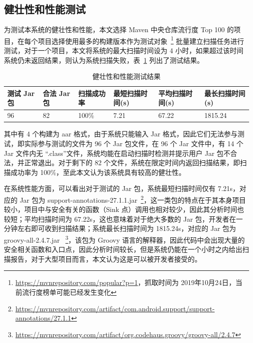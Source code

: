 \subsection{健壮性和性能测试}

为测试本系统的健壮性和性能，本文选择 Maven 中央仓库流行度 Top 100 的项目，在每个项目选择使用最多的构建版本作为测试对象~\footnote{\url{https://mvnrepository.com/popular?p=1}，抓取时间为 2019年10月24日，当前流行度榜单可能已经发生变化} 批量建立扫描任务进行测试，对于一个项目，本文将系统的最大扫描时间设为 4 小时，如果超过该时间系统仍未返回结果，则认为系统扫描失败，表~\ref{robustTest} 列出了测试结果。

\begin{table}[!htb]\footnotesize
    \centering
    \caption{健壮性和性能测试结果}
    \begin{tabular}{llllll}
        \toprule
        \textbf{测试 Jar 包}&\textbf{合法 Jar 包} & \textbf{扫描成功率} &\textbf{最短扫描时间(s)}&\textbf{平均扫描时间(s)} & \textbf{最长扫描时间(s)} \\
        \midrule
        96 & 82 & 100\%  & 7.21 & 67.22 &1815.24 \\
        \bottomrule
    \end{tabular}
    \label{robustTest}
\end{table}

其中有 4 个构建为 aar 格式，由于系统只能输入 Jar 格式，因此它们无法参与测试，即实际参与测试的文件为 96 个 Jar 包文件，在 96 个 Jar 文件中，有 14 个Jar 文件内无 “.class”文件，系统均能在启动扫描时检测并提示用户 Jar 包不合法，并正常退出。对于剩下的 82 个文件，系统在限定时间内返回扫描结果，即扫描成功率为 100\%，至此本文认为该系统具有较高的健壮性。

在系统性能方面，可以看出对于测试的 Jar 包，系统最短扫描时间仅有 7.21s，对应的 Jar 包为 support-annotations-27.1.1.jar~\footnote{\url{https://mvnrepository.com/artifact/com.android.support/support-annotations/27.1.1}}，这一类包的特点在于其本身项目较小，项目中与安全有关的函数（Sink 点）调用也相对较少，因此其分析时间也较短；平均扫描时间为 67.22s，这也意味着对于绝大多数的 Jar 包，开发者在一分钟左右即可收到扫描结果；系统最长扫描时间为 1815.24s，对应的 Jar 包为 groovy-all-2.4.7.jar ~\footnote{\url{https://mvnrepository.com/artifact/org.codehaus.groovy/groovy-all/2.4.7}}，该包为 Groovy 语言的解释器，因此代码中会出现大量的安全相关函数和入口点，因此分析时间较长，但是系统仍能在一个小时之内给出扫描报告，对于大型项目而言，本文认为这是可以被开发者接受的。

